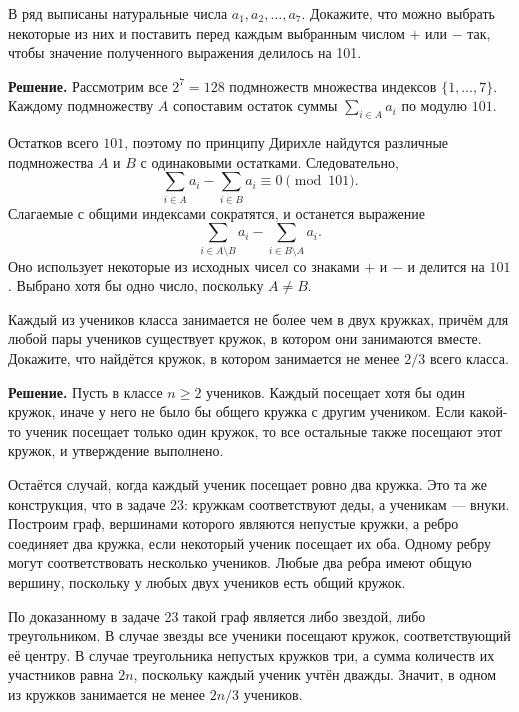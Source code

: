 \begin{problems}
\item В ряд выписаны натуральные числа $a_1,a_2,\ldots,a_7$. Докажите, что можно выбрать некоторые из них и поставить перед каждым выбранным числом $+$ или $-$ так, чтобы значение полученного выражения делилось на 101.
\par\smallskip\noindent\textbf{Решение.} Рассмотрим все $2^7=128$ подмножеств множества индексов $\{1,\ldots,7\}$. Каждому подмножеству $A$ сопоставим остаток суммы $\sum_{i\in A}a_i$ по модулю $101$.
\par Остатков всего $101$, поэтому по принципу Дирихле найдутся различные подмножества $A$ и $B$ с одинаковыми остатками. Следовательно,
\[
\sum_{i\in A}a_i-\sum_{i\in B}a_i\equiv0\pmod{101}.
\]
Слагаемые с общими индексами сократятся, и останется выражение
\[
\sum_{i\in A\setminus B}a_i-\sum_{i\in B\setminus A}a_i.
\]
Оно использует некоторые из исходных чисел со знаками $+$ и $-$ и делится на $101$. Выбрано хотя бы одно число, поскольку $A\ne B$.\par

\item Каждый из учеников класса занимается не более чем в двух кружках, причём для любой пары учеников существует кружок, в котором они занимаются вместе. Докажите, что найдётся кружок, в котором занимается не менее $2/3$ всего класса.
\par\smallskip\noindent\textbf{Решение.} Пусть в классе $n\ge2$ учеников. Каждый посещает хотя бы один кружок, иначе у него не было бы общего кружка с другим учеником. Если какой-то ученик посещает только один кружок, то все остальные также посещают этот кружок, и утверждение выполнено.
\par Остаётся случай, когда каждый ученик посещает ровно два кружка. Это та же конструкция, что в задаче 23: кружкам соответствуют деды, а ученикам --- внуки. Построим граф, вершинами которого являются непустые кружки, а ребро соединяет два кружка, если некоторый ученик посещает их оба. Одному ребру могут соответствовать несколько учеников. Любые два ребра имеют общую вершину, поскольку у любых двух учеников есть общий кружок.
\par По доказанному в задаче 23 такой граф является либо звездой, либо треугольником. В случае звезды все ученики посещают кружок, соответствующий её центру. В случае треугольника непустых кружков три, а сумма количеств их участников равна $2n$, поскольку каждый ученик учтён дважды. Значит, в одном из кружков занимается не менее $2n/3$ учеников.\par


\end{problems}
